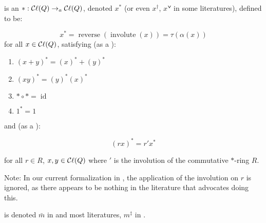 \begin{definition}
    \label{conjugate}
    \leanok

     is an   ${*} : \mathop{\mathcal{C}\ell}(Q) \to_{a} \mathop{\mathcal{C}\ell}(Q)$,
    denoted $x^{*}$ (or even $x^\dagger$, $xᘁ$ in some literatures),
    defined to be:

    $$ x^{*} = \operatorname{reverse}(\operatorname{involute}(x)) = \tau(\alpha(x)) $$ for all $x \in \mathop{\mathcal{C}\ell}(Q)$, satisfying
    (as a \href{https://en.wikipedia.org/wiki/*-algebra#*-ring}{}):

    \begin{enumerate}

    \item $(x + y)^{*} = (x)^{*} + (y)^{*}$
    \item $(x y)^{*} = (y)^{*} (x)^{*}$
    \item ${*} \circ {*} = \operatorname{id}$
    \item $1^{*} = 1$
    
    \end{enumerate}

    and (as a \href{https://en.wikipedia.org/wiki/*-algebra#*-algebra}{}):

    $$ (r x)^{*} = r' x^{*} $$
    
    for all $r \in R$, $x, y \in \mathop{\mathcal{C}\ell}(Q)$ where $'$ is the involution of the commutative $*$-ring $R$.

    Note: In our current formalization in \Mathlib, the application of the involution on $r$ is ignored,
    as there appears to be nothing in the literature that advocates doing this.



     is denoted $\bar{m}$ in \cite{lounestoCliffordAlgebrasSpinors2001} and most literatures, $m^\ddagger$ in \cite{chisolm2012geometric}.

\end{definition}

